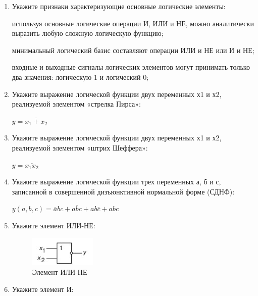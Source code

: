 \documentclass[spec, och, labwork]{shiza}
\begin{document}
\begin{enumerate}
    \item Укажите признаки характеризующие основные логические элементы:
    
    используя основные логические операции И, ИЛИ и НЕ, можно аналитически
    выразить любую сложную логическую функцию;

    минимальный логический базис составляют операции ИЛИ и НЕ или И и НЕ;

    входные и выходные сигналы логических элементов могут принимать только
    два значения: логическую 1 и логический 0;
    \item Укажите выражение логической функции двух переменных х1 и х2, реализуемой элементом «стрелка Пирса»:
    
    $y = \overline{x_1 + x_2}$

    \item Укажите выражение логической функции двух переменных х1 и х2, реализуемой элементом «штрих Шеффера»:
    
    $y = \overline{x_1x_2}$

    \item Укажите выражение логической функции трех переменных а, б и с, записанной
    в совершенной дизъюнктивной нормальной форме (СДНФ):

    $y(a, b, c) = \overline{a}bc + a\overline{b}c + ab\overline{c} + abc$

    \item Укажите элемент ИЛИ-НЕ:
    
    \begin{figure}[H]
        \centering      %
        \includegraphics[width=1.\textwidth]{4}
        \caption{Элемент ИЛИ-НЕ}
        \label{fig:image1}
    \end{figure}

    \item Укажите элемент И:
    

\end{enumerate}
\end{document}
